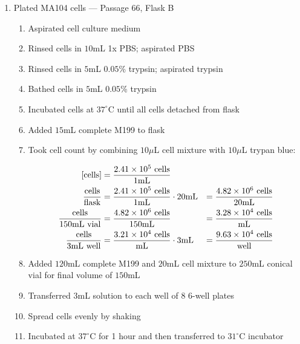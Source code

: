 \begin{enumerate}
	\item Plated MA104 cells --- Passage 66, Flask B
		\begin{enumerate}
			\item Aspirated cell culture medium
			\item Rinsed cells in $10$mL 1x PBS; aspirated PBS
			\item Rinsed cells in $5$mL $0.05$\% trypsin; aspirated trypsin
			\item Bathed cells in $5$mL $0.05$\% trypsin
			\item Incubated cells at $37^{\circ}$C until all cells detached from flask
			\item Added $15$mL complete M199 to flask
			\item Took cell count by combining $10\mu$L cell mixture with $10\mu$L trypan blue:
			
				\begin{align*}
				\text{[cells]} &= \frac{2.41\times 10^{5}\text{ cells}}{1\text{mL}} \\
				\frac{\text{cells}}{\text{flask}} &= \frac{2.41\times 10^{5}\text{ cells}}{1\text{mL}} \cdot 20\text{mL} &= \frac{4.82\times 10^{6}\text{ cells}}{20\text{mL}}\\
				\frac{\text{cells}}{150\text{mL vial}} &= \frac{4.82\times 10^{6}\text{ cells}}{150\text{mL}} &= \frac{3.28\times 10^{4}\text{ cells}}{\text{mL}}\\
				\frac{\text{cells}}{3\text{mL well}} &= \frac{3.21\times 10^{4}\text{ cells}}{\text{mL}} \cdot 3\text{mL} &= \frac{9.63\times 10^{4}\text{ cells}}{\text{well}}\\
				\end{align*}
			\item Added $120$mL complete M199 and $20$mL cell mixture to $250$mL conical vial for final volume of $150$mL
			\item Transferred $3$mL solution to each well of 8 6-well plates
			\item Spread cells evenly by shaking
			\item Incubated at $37^{\circ}$C for 1 hour and then transferred to $31^{\circ}$C incubator
		\end{enumerate}
\end{enumerate}

